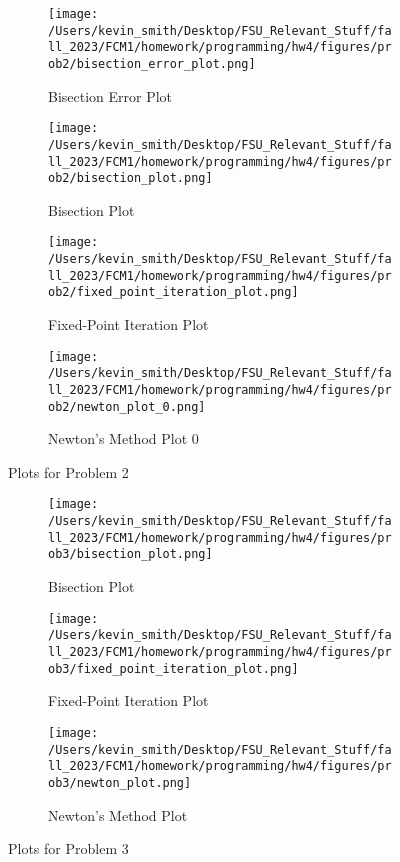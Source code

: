 \documentclass[12pt, letterpaper]{article}
\begin{document}
\begin{figure}[htbp]
    \centering

    \begin{subfigure}{0.45\textwidth}
        \texttt{[image: /Users/kevin\_smith/Desktop/FSU\_Relevant\_Stuff/fall\_2023/FCM1/homework/programming/hw4/figures/prob2/bisection\_error\_plot.png]}
        \caption{Bisection Error Plot}
        \label{fig:prob2_bisection_error}
    \end{subfigure}
    \hfill
    \begin{subfigure}{0.45\textwidth}
        \texttt{[image: /Users/kevin\_smith/Desktop/FSU\_Relevant\_Stuff/fall\_2023/FCM1/homework/programming/hw4/figures/prob2/bisection\_plot.png]}
        \caption{Bisection Plot}
        \label{fig:prob2_bisection}
    \end{subfigure}

    \begin{subfigure}{0.45\textwidth}
        \texttt{[image: /Users/kevin\_smith/Desktop/FSU\_Relevant\_Stuff/fall\_2023/FCM1/homework/programming/hw4/figures/prob2/fixed\_point\_iteration\_plot.png]}
        \caption{Fixed-Point Iteration Plot}
        \label{fig:prob2_fixed_point_iteration}
    \end{subfigure}
    \hfill
    \begin{subfigure}{0.45\textwidth}
        \texttt{[image: /Users/kevin\_smith/Desktop/FSU\_Relevant\_Stuff/fall\_2023/FCM1/homework/programming/hw4/figures/prob2/newton\_plot\_0.png]}
        \caption{Newton's Method Plot 0}
        \label{fig:prob2_newton_0}
    \end{subfigure}

    \caption{Plots for Problem 2}
    \label{fig:prob2_plots}
\end{figure}

\begin{figure}[htbp]
    \centering

    \begin{subfigure}{0.45\textwidth}
        \texttt{[image: /Users/kevin\_smith/Desktop/FSU\_Relevant\_Stuff/fall\_2023/FCM1/homework/programming/hw4/figures/prob3/bisection\_plot.png]}
        \caption{Bisection Plot}
        \label{fig:prob3_bisection}
    \end{subfigure}
    \hfill
    \begin{subfigure}{0.45\textwidth}
        \texttt{[image: /Users/kevin\_smith/Desktop/FSU\_Relevant\_Stuff/fall\_2023/FCM1/homework/programming/hw4/figures/prob3/fixed\_point\_iteration\_plot.png]}
        \caption{Fixed-Point Iteration Plot}
        \label{fig:prob3_fixed_point_iteration}
    \end{subfigure}

    \begin{subfigure}{0.45\textwidth}
        \texttt{[image: /Users/kevin\_smith/Desktop/FSU\_Relevant\_Stuff/fall\_2023/FCM1/homework/programming/hw4/figures/prob3/newton\_plot.png]}
        \caption{Newton's Method Plot}
        \label{fig:prob3_newton}
    \end{subfigure}

    \caption{Plots for Problem 3}
    \label{fig:prob3_plots}
\end{figure}
      
\end{document}

